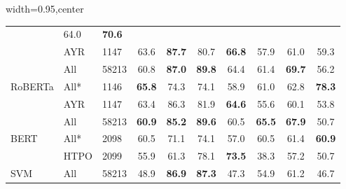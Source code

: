 \begin{table}[ht]
\begin{adjustbox}{width=0.95\textwidth,center}
\begin{tabular}{lll|ccccc|c|c}
        & 64.0                   & \textbf{70.6}            \\
    \multicolumn{1}{l|}{}                             & AYR         & 1147            
        & 63.6                     & \textbf{87.7}           & 80.7                    & \textbf{66.8}           & 57.9          
        & 61.0                   & 59.3                     \\ \hline
    \multicolumn{1}{l|}{\multirow{3}{*}{RoBERTa}}     & All         & 58213           
        & 60.8                     & \textbf{87.0}           & \textbf{89.8}           & 64.4                    & 61.4          
        & \textbf{69.7}          & 56.2                     \\
    \multicolumn{1}{l|}{}                             & All*        & 1146            
        & \textbf{65.8}            & 74.3                    & 74.1                    & 58.9                    & 61.0          
        & 62.8                   & \textbf{78.3}            \\
    \multicolumn{1}{l|}{}                             & AYR         & 1147            
        & 63.4                     & 86.3                    & 81.9                    & \textbf{64.6}           & 55.6          
        & 60.1                   & 53.8                     \\ \hline
    \multicolumn{1}{l|}{\multirow{3}{*}{BERT}}        & All         & 58213           
        & \textbf{60.9}            & \textbf{85.2}           & \textbf{89.6}           & 60.5                    & \textbf{65.5} 
        & \textbf{67.9}          & 50.7                     \\
    \multicolumn{1}{l|}{}                             & All*        & 2098            
        & 60.5                     & 71.1                    & 74.1                    & 57.0                    & 60.5          
        & 61.4                   & \textbf{60.9}            \\
    \multicolumn{1}{l|}{}                             & HTPO        & 2099            
        & 55.9                     & 61.3                    & 78.1                    & \textbf{73.5}           & 38.3          
        & 57.2                   & 50.7                     \\ \hline
    \multicolumn{1}{l|}{\multirow{3}{*}{SVM}}         & All         & 58213           
        & 48.9                     & \textbf{86.9}           & \textbf{87.3}           & 47.3                    & 54.9          
        & 61.2                   & 46.7                     \\

\end{tabular}
\end{adjustbox}
\end{table}

